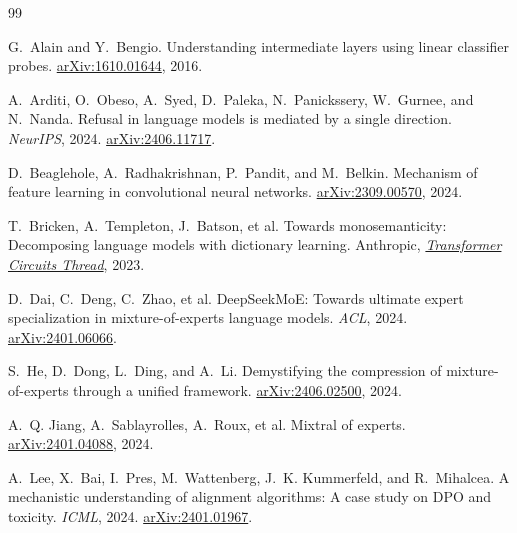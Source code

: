 \documentclass[11pt]{article}
\begin{document}
\begin{thebibliography}{99}\small

G.~Alain and Y.~Bengio.
\newblock Understanding intermediate layers using linear classifier probes.
\newblock \href{https://arxiv.org/abs/1610.01644}{arXiv:1610.01644}, 2016.

A.~Arditi, O.~Obeso, A.~Syed, D.~Paleka, N.~Panickssery, W.~Gurnee, and N.~Nanda.
\newblock Refusal in language models is mediated by a single direction.
\newblock \textit{NeurIPS}, 2024.
\href{https://arxiv.org/abs/2406.11717}{arXiv:2406.11717}.

D.~Beaglehole, A.~Radhakrishnan, P.~Pandit, and M.~Belkin.
\newblock Mechanism of feature learning in convolutional neural networks.
\newblock \href{https://arxiv.org/abs/2309.00570}{arXiv:2309.00570}, 2024.

T.~Bricken, A.~Templeton, J.~Batson, et al.
\newblock Towards monosemanticity: Decomposing language models with dictionary learning.
\newblock Anthropic,
\href{https://transformer-circuits.pub/2023/monosemantic-features}{\textit{Transformer Circuits Thread}}, 2023.

D.~Dai, C.~Deng, C.~Zhao, et al.
\newblock DeepSeekMoE: Towards ultimate expert specialization in mixture-of-experts language models.
\newblock \textit{ACL}, 2024.
\href{https://arxiv.org/abs/2401.06066}{arXiv:2401.06066}.

S.~He, D.~Dong, L.~Ding, and A.~Li.
\newblock Demystifying the compression of mixture-of-experts through a unified framework.
\newblock \href{https://arxiv.org/abs/2406.02500}{arXiv:2406.02500}, 2024.

A.~Q. Jiang, A.~Sablayrolles, A.~Roux, et al.
\newblock Mixtral of experts.
\newblock \href{https://arxiv.org/abs/2401.04088}{arXiv:2401.04088}, 2024.

A.~Lee, X.~Bai, I.~Pres, M.~Wattenberg, J.~K. Kummerfeld, and R.~Mihalcea.
\newblock A mechanistic understanding of alignment algorithms: A case study on DPO and toxicity.
\newblock \textit{ICML}, 2024.
\href{https://arxiv.org/abs/2401.01967}{arXiv:2401.01967}.


\end{thebibliography}
\end{document}
